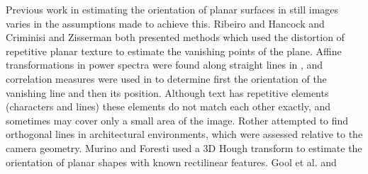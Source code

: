 \documentclass{article}
\begin{document}
Previous work in estimating the orientation of planar surfaces in still images
varies in the assumptions made to achieve this.  Ribeiro and
Hancock \cite{ribeiro} and Criminisi and Zisserman \cite{zisserman} both
presented methods which used the distortion of repetitive planar texture to estimate the vanishing points
of the plane.  Affine transformations in power spectra were found along straight
lines in \cite{ribeiro}, and correlation measures were used in
\cite{zisserman} to determine first the orientation of the vanishing line and
then its position.  Although text has repetitive elements (characters and lines)
these elements do not match each other exactly, and sometimes may cover only a
small area of the image.
Rother \cite{rother0} attempted to find orthogonal lines in architectural
environments, which were assessed relative to the camera geometry.  Murino and
Foresti \cite{MURIN} used a 3D Hough transform to estimate the orientation of
planar shapes with known rectilinear features.  Gool et al. \cite{GOOL} and
\end{document}
